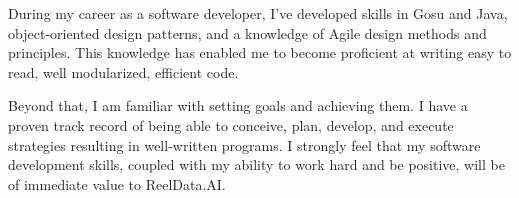 During my career as a software developer, I’ve developed skills in Gosu and Java, object-oriented design patterns, and a knowledge of Agile design methods and principles. This knowledge has enabled me to become proficient at writing easy to read, well modularized, efficient code.

Beyond that, I am familiar with setting goals and achieving them. I have a proven track record of being able to conceive, plan, develop, and execute strategies resulting in well-written programs. I strongly feel that my software development skills, coupled with my ability to work hard and be positive, will be of immediate value to ReelData.AI.